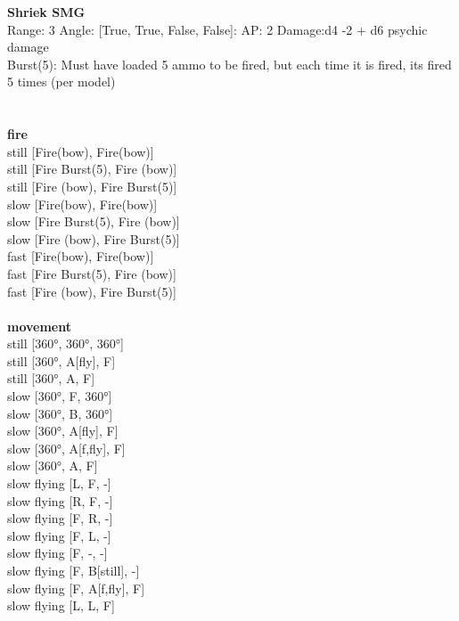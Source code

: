 {\bf Shriek SMG } \\



Range: 3  Angle: [True, True, False, False]: AP: 2 Damage:d4 -2 + d6 psychic damage \\
Burst(5): Must have loaded 5 ammo to be fired, but each time it is fired, its fired 5 times (per model)\\ 




 
\ \\



\ \\ {\bf fire } \\
still [Fire(bow), Fire(bow)] \\
still [Fire Burst(5), Fire (bow)] \\
still [Fire (bow), Fire Burst(5)] \\
slow [Fire(bow), Fire(bow)] \\
slow [Fire Burst(5), Fire (bow)] \\
slow [Fire (bow), Fire Burst(5)] \\
fast [Fire(bow), Fire(bow)] \\
fast [Fire Burst(5), Fire (bow)] \\
fast [Fire (bow), Fire Burst(5)] \\
\ \\ {\bf movement } \\
still [360°, 360°, 360°] \\
still [360°, A[fly], F] \\
still [360°, A, F] \\
slow [360°, F, 360°] \\
slow [360°, B, 360°] \\
slow [360°, A[fly], F] \\
slow [360°, A[f,fly], F] \\
slow [360°, A, F] \\
slow flying [L, F, -] \\
slow flying [R, F, -] \\
slow flying [F, R, -] \\
slow flying [F, L, -] \\
slow flying [F, -, -] \\
slow flying [F, B[still], -] \\
slow flying [F, A[f,fly], F] \\
slow flying [L, L, F] \\
